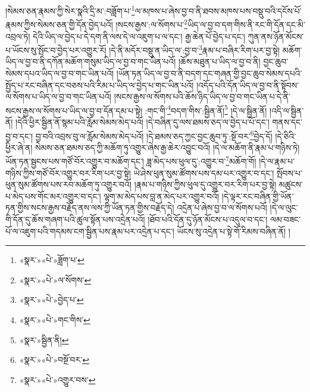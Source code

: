 །སེམས་ཅན་རྣམས་ཀྱི་སེར་སྣའི་དྲི་མ་:བཟློག་པ་\footnote{«སྣར་»«པེ་»ཟློག་པ་}ལ་མཁས་པ་ཞེས་བྱ་བ་ནི་ཐབས་མཁས་པས་བསྡུ་བའི་དངོས་པོ་རྣམས་ཀྱིས་སེམས་ཅན་གྱི་དོན་བྱེད་པའོ། །སངས་རྒྱས་:ལ་སོགས་པ་\footnote{«སྣར་»«པེ་»ལ་སོགས་}ཡིད་ལ་བྱ་བ་དག་གིས་ནི་རང་གི་དོན་དང་མི་འབྲལ་ཏེ། དེའི་ཡིད་ལ་བྱེད་པ་དེ་དག་ནི་ལས་དེ་ལ་འཇུག་པ་ལ་དང་། རྒྱ་ཆེན་པོ་བྱེད་པ་དང་། ཀུན་ནས་ཉོན་མོངས་པ་ཡོངས་སུ་སྤོང་བ་བྱེད་པར་འགྱུར་རོ། །དེ་ནི་མདོར་བསྡུ་ན་ཡིད་ལ་:བྱ་བ་\footnote{«སྣར་»«པེ་»བྱེད་པ་}རྣམ་པ་བཞིར་རིག་པར་བྱ་སྟེ། མཆོག་ཡིད་ལ་བྱ་བ་ནི་དཀོན་མཆོག་གསུམ་ཡིད་ལ་བྱ་བ་གང་ཡིན་པའོ། །ཆོས་མཐུན་པ་ཡིད་ལ་བྱ་བ་ནི། བྱང་ཆུབ་སེམས་དཔའ་ཡིད་ལ་བྱ་བ་གང་ཡིན་པའོ། །ཡོན་ཏན་ཡིད་ལ་བྱ་བ་ནི་བདག་དང་གཞན་གྱི་བྱང་ཆུབ་སེམས་དཔའི་སྤྱོད་པ་རང་བཞིན་དང་བཅས་པའི་རིམ་པ་ཡིད་ལ་བྱེད་པ་གང་ཡིན་པའོ། །འདོད་པའི་དོན་ཡིད་ལ་བྱ་བ་ནི་སྟོབས་ལ་སོགས་པ་ཡིད་ལ་བྱ་བ་གང་ཡིན་པའོ། །སངས་རྒྱས་ལ་སོགས་པའི་ཆོས་ཉིད་ཡིད་ལ་བྱ་བ་གང་ཡིན་པ་དེ་ནི་སངས་རྒྱས་ལ་སོགས་པ་ཡིད་ལ་བྱ་བ་དོན་དམ་པ་སྟེ། :གང་གི་\footnote{«སྣར་»«པེ་»གང་གིས་}བདག་གིས་:སྦྱིན་ནོ།\footnote{«སྣར་»སྦྱིན་ནི།} །དེ་ལ་སྦྱིན་ནོ། །འདི་ལ་སྦྱིན་ནོ། །དེའི་ཕྱིར་སྦྱིན་ནོ་སྙམ་པའི་རློམ་སེམས་མེད་པའོ། །དེ་བཞིན་དུ་ལས་ཐམས་ཅད་ལ་བྱེད་པ་པོ་དང་། གནས་དང་བྱ་བ་དང་། བྱ་བའི་འབྲས་བུ་ལ་རློམ་སེམས་མེད་པའོ། །དེ་ཐམས་ཅད་ཀྱང་བྱང་ཆུབ་ཏུ་:སྔོ་བར་\footnote{«སྣར་»«པེ་»བསྔོ་བར་}བྱེད་དོ། །དེ་ཅིའི་ཕྱིར་ཞེ་ན། སེམས་ཅན་ཐམས་ཅད་ཀྱི་མཆོག་ཏུ་འགྱུར་ཞེས་རྒྱ་ཆེར་འབྱུང་བའོ། །དེ་ལ་མཆོག་ནི་རྣམ་པ་གཉིས་ཏེ། ཡོན་ཏན་སྦྱངས་པས་གཙོ་བོར་འགྱུར་བ་མཆོག་དང་། ཟླ་མེད་པས་ཕུལ་དུ་:འགྱུར་བ་\footnote{«སྣར་»«པེ་»འགྱུར་བས་}མཆོག་གོ། །དེ་ལ་རྣམ་པ་གཉིས་ཀྱིས་གཙོ་བོར་འགྱུར་བར་རིག་པར་བྱ་སྟེ། ཡེ་ཤེས་ཕུན་སུམ་ཚོགས་པས་དམ་པར་འགྱུར་བ་དང་། སྤོབས་པ་ཕུན་སུམ་ཚོགས་པས་རབ་མཆོག་ཏུ་འགྱུར་བའོ། །རྣམ་པ་གཉིས་ཀྱིས་ཕུལ་དུ་འགྱུར་བར་རིག་པར་བྱ་སྟེ། མཚུངས་པ་མེད་པས་གོང་མར་འགྱུར་བ་དང་། ལྷག་མ་མེད་པས་བླ་ན་མེད་པར་འགྱུར་བའོ། །དེ་ལྟར་རང་བཞིན་གྱི་ཡོན་ཏན་གྱིས་སངས་རྒྱས་བརྗོད་ནས་ལས་ཀྱི་ཡོན་ཏན་གྱིས་བརྗོད་དེ། འདྲེན་པ་ཞེས་བྱ་བ་ལ་སོགས་པའོ། །དེ་ལ་ལུང་གི་དོན་དུ་ཆོས་གཞག་པའི་ཚུལ་སྟོན་པས་འདྲེན་པའོ། །ཐོབ་པའི་དོན་དུ་ཉོན་མོངས་པ་འདུལ་བ་དང་། ལམ་བཟང་པོ་ལ་འཇུག་པའི་གདམས་ངག་སྦྱིན་པས་རྣམ་པར་འདྲེན་པ་དང་། ཡོངས་སུ་འདྲེན་པ་སྟེ་གོ་རིམས་བཞིན་ནོ། །
